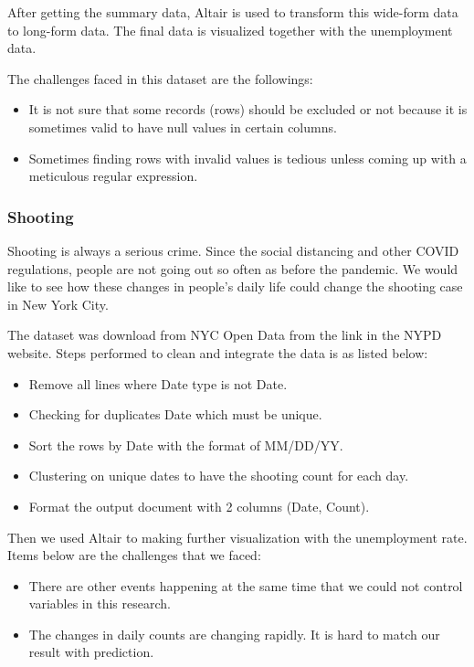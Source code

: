 \documentclass[conference]{IEEEtran}
\begin{document}
After getting the summary data, Altair is used to transform this wide-form data to long-form data. The final data is visualized together with the unemployment data.

The challenges faced in this dataset are the followings:
\begin{itemize}
    \item It is not sure that some records (rows) should be excluded or not because it is sometimes valid to have null values in certain columns.
    \item Sometimes finding rows with invalid values is tedious unless coming up with a meticulous regular expression.
\end{itemize}

\subsubsection{Shooting}
Shooting is always a serious crime. Since the social distancing and other COVID regulations, people are not going out so often as before the pandemic. We would like to see how these changes in people's daily life could change the shooting case in New York City.

The dataset was download from NYC Open Data from the link in the NYPD website. Steps performed to clean and integrate the data is as listed below:
\begin{itemize}
    \item Remove all lines where Date type is not Date.
    \item Checking for duplicates Date which must be unique.
    \item Sort the rows by Date with the format of MM/DD/YY.
    \item Clustering on unique dates to have the shooting count for each day.
    \item Format the output document with 2 columns (Date, Count).
\end{itemize}
Then we used Altair to making further visualization with the unemployment rate.
Items below are the challenges that we faced:
\begin{itemize}
    \item There are other events happening at the same time that we could not control variables in this research.
    \item The changes in daily counts are changing rapidly. It is hard to match our result with prediction.
\end{itemize}		
\end{document}
